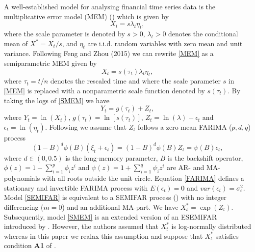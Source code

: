 \documentclass[12pt]{article}
\begin{document}
A well-established model for  analysing financial time series data is the multiplicative error model (MEM) (\cite{engle2002dynamic})  which is given by 
\begin{equation}
\label{MEM}
X_t=s \lambda_t \eta_t,
\end{equation}
where the scale parameter is denoted by $s >0$, $\lambda_t >0$ denotes the conditional mean of $X^*=X_t/s$, and $\eta_t$ are i.i.d. random variables with zero mean and unit variance. Following Feng and Zhou (2015) we can rewrite \eqref{MEM} as a semiparametric MEM given by
\begin{equation}
\label{SMEM}
X_t=s(\tau_t)\lambda_t \eta_t,
\end{equation}   
where $\tau_t=t/n$ denotes the rescaled time and where the scale parameter $s$ in \eqref{MEM} is replaced with a nonparametric scale function denoted by $s(\tau_t)$. 
By taking the logs of \eqref{SMEM} we have
\begin{equation}
\label{SEMIFAR}
Y_t=g(\tau_t) + Z_t,
\end{equation}
where $Y_t=\ln(X_t)$, $g(\tau_t)=\ln[s(\tau_t)]$, $Z_t=\ln(\lambda) + \epsilon_t$ and $\epsilon_t=\ln(\eta_t)$. Following \citet{beran2002semifar} we assume that $Z_t$ follows a zero mean FARIMA ($p, d, q$) process 
\begin{equation}
\label{FARIMA}
(1-B)^d\phi(B)(\xi_t + \epsilon_t)=(1-B)^d\phi(B)Z_t =\psi(B)\epsilon_t,
\end{equation}
where $d \in (0,0.5)$ is the long-memory parameter, $B$ is the backshift operator, $\phi(z)=1-\sum_{i=1}^{p}\phi_iz^i$ and  $\psi(z)=1+\sum_{i=1}^{q}\psi_iz^i$ are AR- and MA-polynomials with all roots outside the unit circle. Equation \eqref{FARIMA} defines a stationary and invertible FARIMA process with $E(\epsilon_t)=0$ and $var(\epsilon_t)=\sigma^2_{\epsilon}$. Model \eqref{SEMIFAR} is equivalent to a SEMIFAR process (\cite{beran2002semifar}) with no integer differencing ($m=0$) and an additional MA-part. We have $X^*_t = \exp(Z_t)$. Subsequently, model \eqref{SMEM} is an extended version of an ESEMIFAR introduced by \citet{beran2015modelling}. However, the authors assumed that $X^*_t$ is log-normally distributed whereas in this paper we realax this assumption and suppose that $X_t^*$ satisfies condition \textbf{A1} of \citet{feng2020fractionally}.
\end{document}

